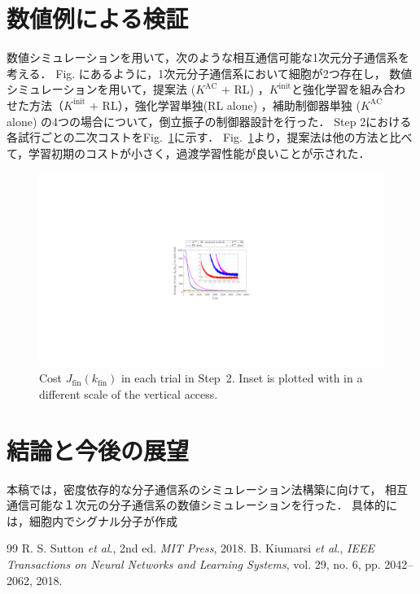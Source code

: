 \documentclass[twocolumn]{jarticle}
\newcommand{\rfig}[1]{Fig.~\ref{#1}}
\begin{document}
\section{数値例による検証}
数値シミュレーションを用いて，次のような相互通信可能な1次元分子通信系を考える．
Fig. にあるように，1次元分子通信系において細胞が2つ存在し，
数値シミュレーションを用いて，提案法 ($K^{\mathrm{AC}}$ + RL) ，$K^{\mathrm{init}}$と強化学習を組み合わせた方法（$K^{\mathrm{init}}$ + RL），強化学習単独(RL alone) ，補助制御器単独 ($K^{\mathrm{AC}}$ alone) の4つの場合について，倒立振子の制御器設計を行った．
Step 2における各試行ごとの二次コストを\rfig{fig:simulation}に示す．
\rfig{fig:simulation}より，提案法は他の方法と比べて，学習初期のコストが小さく，過渡学習性能が良いことが示された．
\begin{figure}[tb]
    \centering
    \includegraphics[width=\columnwidth]{figures/step2_cost_fig.pdf}
    \caption{Cost $J_\mathrm{fin}(k_{\mathrm{fin}})$ in each trial in Step~2. Inset is plotted with in a different scale of the vertical access. %
    }
    \label{fig:simulation}
\end{figure}


\section{結論と今後の展望}
本稿では，密度依存的な分子通信系のシミュレーション法構築に向けて，
相互通信可能な１次元の分子通信系の数値シミュレーションを行った．
具体的には，細胞内でシグナル分子が作成



\begin{thebibliography} {99}
     R. S. Sutton {\it et al}., %
    2nd ed. { \it MIT Press}, 2018.
     B. Kiumarsi {\it et al}., 
    {\it IEEE Transactions on Neural Networks and Learning Systems}, vol. 29, no. 6, pp. 2042–2062, 2018.
\end{thebibliography}
\end{document}
